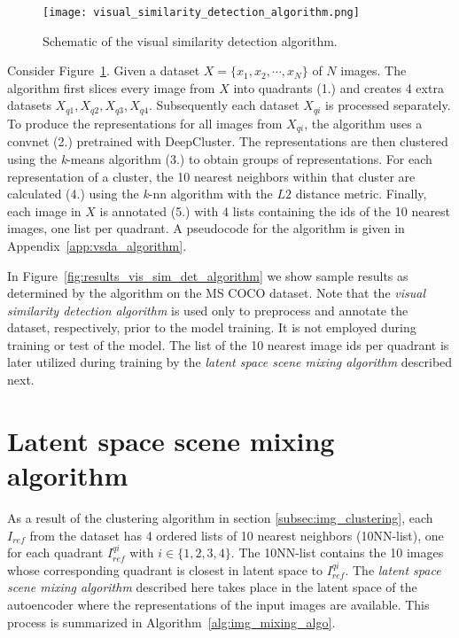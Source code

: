 \documentclass[a4paper,12pt]{report}
\begin{document}
\begin{figure}[ht]
\centering
\texttt{[image: visual\_similarity\_detection\_algorithm.png]}
\caption{Schematic of the visual similarity detection algorithm.}
\label{fig:schematic_vsda}
\end{figure}
Consider Figure~\ref{fig:schematic_vsda}. Given a dataset $X = \{x_1,x_2,\cdots,x_N\}$ of $N$ images. The algorithm first slices every image from $X$ into quadrants (1.) and creates 4 extra datasets $X_{q1}, X_{q2}, X_{q3}, X_{q4}$. Subsequently each dataset $X_{qi}$ is processed separately. To produce the representations for all images from $X_{qi}$, the algorithm uses a convnet (2.) pretrained with DeepCluster. The representations are then clustered using the \textit{k}-means algorithm (3.) to obtain groups of representations. For each representation of a cluster, the 10 nearest neighbors within that cluster are calculated (4.) using the \textit{k}-nn algorithm with the $L2$ distance metric. Finally, each image in $X$ is annotated (5.) with 4 lists containing the ids of the 10 nearest images, one list per quadrant. A pseudocode for the algorithm is given in Appendix~\ref{app:vsda_algorithm}.


In Figure~\ref{fig:results_vis_sim_det_algorithm} we show sample results as determined by the algorithm on the MS COCO dataset. Note that the \textit{visual similarity detection algorithm} is used only to preprocess and annotate the dataset, respectively, prior to the model training. It is not employed during training or test of the model. The list of the 10 nearest image ids per quadrant is later utilized during training by the \textit{latent space scene mixing algorithm} described next.

\section{Latent space scene mixing algorithm} \label{subsec:img_mixing_algo}
As a result of the clustering algorithm in section \ref{subsec:img_clustering}, each $I_{ref}$ from the dataset has 4 ordered lists of 10 nearest neighbors (10NN-list), one for each quadrant $I^{qi}_{ref}$ with $i \in \{1,2,3,4\}$. The 10NN-list contains the 10 images whose corresponding quadrant is closest in latent space to $I^{qi}_{ref}$. The \textit{latent space scene mixing algorithm} described here takes place in the latent space of the autoencoder where the representations of the input images are available. This process is summarized in Algorithm~\ref{alg:img_mixing_algo}. 
\end{document}
